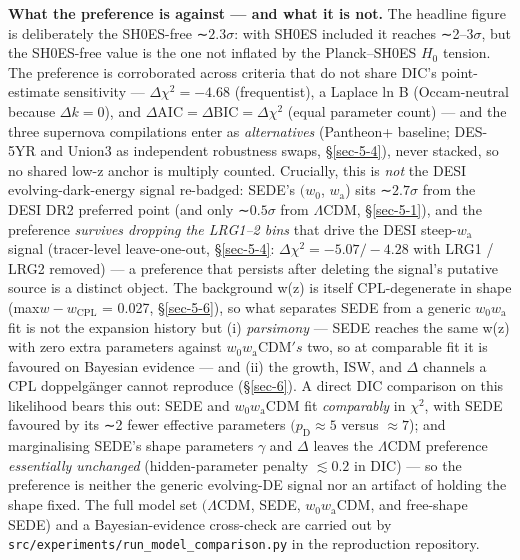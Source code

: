 \documentclass[preprint,12pt]{elsarticle}
\begin{document}
\textbf{What the preference is against --- and what it is not.} The
headline figure is deliberately the SH0ES-free ∼\(2.3\sigma\): with
SH0ES included it reaches ∼2--\(3\sigma\), but the SH0ES-free value is
the one not inflated by the Planck--SH0ES \(H_{0}\) tension. The
preference is corroborated across criteria that do not share DIC's
point-estimate sensitivity --- \(\Delta \chi ^{2} = -4.68\)
(frequentist), a Laplace ln B (Occam-neutral because \(\Delta k = 0\)),
and \(\Delta \mathrm{AIC} = \Delta \mathrm{BIC} = \Delta \chi ^{2}\)
(equal parameter count) --- and the three supernova compilations enter
as \emph{alternatives} (Pantheon+ baseline; DES-5YR and Union3 as
independent robustness swaps, §\ref{sec-5-4}), never stacked, so no
shared low-z anchor is multiply counted. Crucially, this is \emph{not}
the DESI evolving-dark-energy signal re-badged: SEDE's \((w_{0}\),
\(w_{\mathrm{a}}\)) sits ∼\(2.7\sigma\) from the DESI DR2 preferred
point (and only ∼\(0.5\sigma\) from \(\Lambda \mathrm{CDM}\),
§\ref{sec-5-1}), and the preference \emph{survives dropping the LRG1--2
bins} that drive the DESI steep-\(w_{\mathrm{a}}\) signal (tracer-level
leave-one-out, §\ref{sec-5-4}: \(\Delta \chi ^{2} = -5.07 / -4.28\) with
LRG1 / LRG2 removed) --- a preference that persists after deleting the
signal's putative source is a distinct object. The background w(z) is
itself CPL-degenerate in shape
(max\textbar{}\(w - w_\mathrm{CPL}\)\textbar{} = 0.027, §\ref{sec-5-6}),
so what separates SEDE from a generic \(w_{0}w_{\mathrm{a}}\) fit is not
the expansion history but (i) \emph{parsimony} --- SEDE reaches the same
w(z) with zero extra parameters against
\(w_{0}w_{\mathrm{a}}\mathrm{CDM}'s\) two, so at comparable fit it is
favoured on Bayesian evidence --- and (ii) the growth, ISW, and
\(\Delta\) channels a CPL doppelgänger cannot reproduce (§\ref{sec-6}).
A direct DIC comparison on this likelihood bears this out: SEDE and
\(w_{0}w_{\mathrm{a}}\mathrm{CDM}\) fit \emph{comparably} in
\(\chi ^{2}\), with SEDE favoured by its ∼2 fewer effective parameters
\((p_{\mathrm{D}} \approx  5\) versus \(\approx  7\)); and marginalising
SEDE's shape parameters \(\gamma\) and \(\Delta\) leaves the
\(\Lambda \mathrm{CDM}\) preference \emph{essentially unchanged}
(hidden-parameter penalty \(\lesssim  0.2\) in DIC) --- so the
preference is neither the generic evolving-DE signal nor an artifact of
holding the shape fixed. The full model set \((\Lambda \mathrm{CDM}\),
SEDE, \(w_{0}w_{\mathrm{a}}\mathrm{CDM}\), and free-shape SEDE) and a
Bayesian-evidence cross-check are carried out by
\texttt{src/\allowbreak experiments/\allowbreak run\_\allowbreak model\_\allowbreak comparison.\allowbreak py} in the reproduction
repository.
\end{document}
